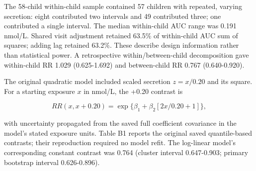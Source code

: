 \documentclass[
  american,
  11pt,
  letterpaper,
]{article}
\begin{document}
The 58-child within-child sample contained 57 children with repeated,
varying secretion: eight contributed two intervals and 49 contributed
three; one contributed a single interval. The median within-child AUC
range was 0.191 nmol/L. Shared visit adjustment retained 63.5\% of
within-child AUC sum of squares; adding lag retained 63.2\%. These
describe design information rather than statistical power. A
retrospective within/between-child decomposition gave within-child RR
1.029 (0.625-1.692) and between-child RR 0.767 (0.640-0.920).

The original quadratic model included scaled secretion \(z=x/0.20\) and
its square. For a starting exposure \(x\) in nmol/L, the +0.20 contrast
is

\[
RR(x,x+0.20)=\exp\{\beta_1+\beta_2[2x/0.20+1]\},
\]

with uncertainty propagated from the saved full coefficient covariance
in the model's stated exposure units. Table B1 reports the original
saved quantile-based contrasts; their reproduction required no model
refit. The log-linear model's corresponding constant contrast was 0.764
(cluster interval 0.647-0.903; primary bootstrap interval 0.626-0.896).
\end{document}
